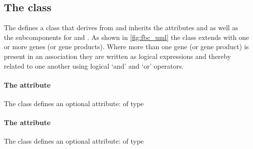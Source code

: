 %


%

%


\subsection{The \FBC {} class}
\label{geneproteinassociation-class}

The \FBCPackage defines a \GeneProteinAssociation class that derives
from \SBase and inherits the attributes  and 
as well as the subcomponents for \Annotation and \Notes. As shown in
\ref{fig:fbc_uml} the \GeneProteinAssociation class extends \Reaction with
one or more genes (or gene products). Where more than one gene (or gene product) is present in an association they are written as logical expressions and thereby related to one another using logical `and' and `or' operators.

\paragraph{The  attribute}
The \GeneProteinAssociation class defines an optional attribute: 
of type 

\paragraph{The  attribute}
The \GeneProteinAssociation class defines an optional attribute: 
of type 


